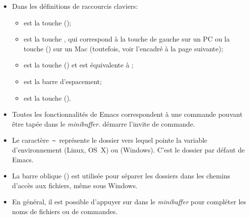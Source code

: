 \begin{itemize}
\item Dans les définitions de raccourcis claviers:
  \begin{itemize}
  \item {} est la touche  (\ctlkey);
  \item {} est la touche , qui correspond à la touche
     de gauche sur un PC ou la touche 
    (\optkey) sur un Mac (toutefois, voir l'encadré à la page
    suivante);
  \item {} est la touche  (\esckey) et
    est équivalente à ;
  \item {} est la barre d'espacement;
  \item {} est la touche  (\returnkey).
  \end{itemize}
\item Toutes les fonctionnalités de Emacs correspondent à une commande
  pouvant être tapée dans le \emph{minibuffer}.  démarre
  l'invite de commande.
\item Le caractère \,\verb=~=\, représente le dossier vers lequel
  pointe la variable d'environnement  (Linux, OS~X) ou
   (Windows). C'est le dossier par défaut de Emacs.
\item La barre oblique (\code{/}) est utilisée pour séparer les
  dossiers dans les chemins d'accès aux fichiers, même sous Windows.
\item En général, il est possible d'appuyer sur  dans le
  \emph{minibuffer} pour compléter les noms de fichiers ou de
  commandes.
\end{itemize}

